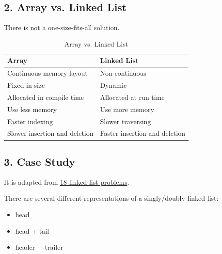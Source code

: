 \documentclass[aspectratio=169, 14pt]{beamer}
\begin{document}
\begin{frame}
    \section{\textcolor{darkmidnightblue}{2. Array vs. Linked List}}
    There is not a one-size-fits-all solution.

\end{frame}

\begin{frame}
    \begin{table}
        \caption*{Array vs. Linked List}
        \begin{tabular}{ll}
          \toprule
          Array & Linked List \\
          \midrule
          Continuous memory layout & Non-continuous \\
          Fixed in size & Dynamic \\
          Allocated in compile time & Allocated at run time \\
          Use less memory & Use more memory \\
          Faster indexing  & Slower traversing \\
          Slower insertion and deletion & Faster insertion and deletion \\
          \bottomrule
        \end{tabular}
    \end{table} 
\end{frame}

\begin{frame}
    \section{\textcolor{darkmidnightblue}{3. Case Study}}
    It is adapted from \href{http://cslibrary.stanford.edu/105/LinkedListProblems.pdf}{18 linked list problems}.
\end{frame}

{
\begin{frame}[standout]
  There are several different representations of a singly/doubly linked list:
  \begin{itemize}
    \item head
    \item head + tail
    \item header + trailer
  \end{itemize}
\end{frame}
}
\end{document}

